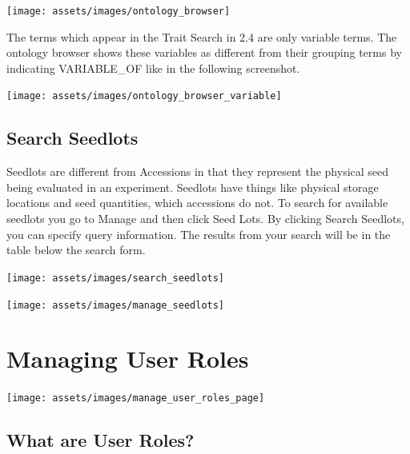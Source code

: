 \documentclass[
  12pt,
]{book}
\begin{document}
\begin{center}\texttt{[image: assets/images/ontology\_browser]} \end{center}

The terms which appear in the Trait Search in 2.4 are only variable terms. The ontology browser shows these variables as different from their grouping terms by indicating VARIABLE\_OF like in the following screenshot.

\begin{center}\texttt{[image: assets/images/ontology\_browser\_variable]} \end{center}

\hypertarget{search-seedlots}{%
\section{Search Seedlots}\label{search-seedlots}}

Seedlots are different from Accessions in that they represent the physical seed being evaluated in an experiment. Seedlots have things like physical storage locations and seed quantities, which accessions do not. To search for available seedlots you go to Manage and then click Seed Lots. By clicking Search Seedlots, you can specify query information. The results from your search will be in the table below the search form.

\begin{center}\texttt{[image: assets/images/search\_seedlots]} \end{center}

\begin{center}\texttt{[image: assets/images/manage\_seedlots]} \end{center}

\hypertarget{managing-user-roles}{%
\chapter{Managing User Roles}\label{managing-user-roles}}

\begin{center}\texttt{[image: assets/images/manage\_user\_roles\_page]} \end{center}

\hypertarget{what-are-user-roles}{%
\section{What are User Roles?}\label{what-are-user-roles}}
\end{document}
